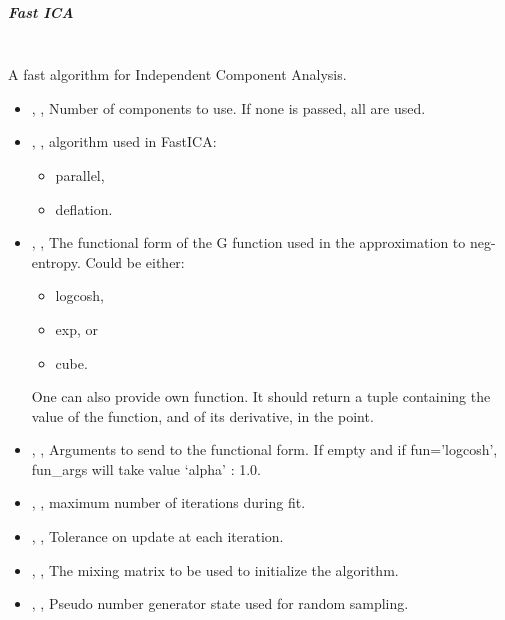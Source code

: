 \subparagraph{Fast ICA} \hfil \\
\label{subparagraph:FastICA}
A fast algorithm for Independent Component Analysis.
\begin{itemize}
	\item {}, , Number of components to
	use. If none is passed, all are used. 
	\item {}, , algorithm used in FastICA:
	\begin{itemize}
		\item parallel,
		\item deflation.
	\end{itemize}
	\item {}, , The functional form of
	the G function used in the approximation to neg-entropy. Could be either:
	\begin{itemize}
		\item logcosh,
		\item exp, or
		\item cube.
	\end{itemize}
	One can also provide own function. It should return a tuple containing the value of the
	 function, and of its derivative, in the point. 
	\item {}, , Arguments to send to the
	functional form. If empty and if fun=’logcosh’, fun\_args will take value {‘alpha’ : 1.0}.
	\item {}, , maximum number of iterations
	 during fit. 
	\item {}, , Tolerance on update at each iteration.
	\item {}, , The mixing matrix to be used to initialize the algorithm. 
	\item {}, , Pseudo number
	 generator state used for random sampling. 
\end{itemize}

